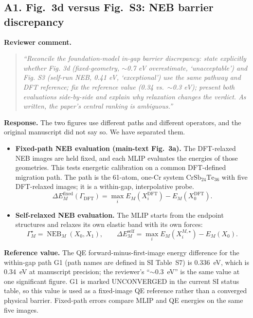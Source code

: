 \documentclass[11pt,a4paper]{article}
\begin{document}
\subsection*{A1. Fig.~3d versus Fig.~S3: NEB barrier discrepancy}

\noindent\textbf{Reviewer comment.}
\begin{quote}
\itshape
``Reconcile the foundation-model in-gap barrier discrepancy: state explicitly whether Fig. 3d (fixed-geometry, $\sim$0.7 eV overestimate, `unacceptable') and Fig. S3 (self-run NEB, 0.41 eV, `exceptional') use the same pathway and DFT reference; fix the reference value (0.34 vs.\ $\sim$0.3 eV); present both evaluations side-by-side and explain why relaxation changes the verdict. As written, the paper's central ranking is ambiguous.''
\end{quote}

\noindent\textbf{Response.}
The two figures use different paths and different operators, and the original manuscript did not say so. We have separated them.

\begin{itemize}
    \item \textbf{Fixed-path NEB evaluation (main-text Fig.~3a).}
    The DFT-relaxed NEB images are held fixed, and each MLIP evaluates the energies of those geometries. This tests energetic calibration on a common DFT-defined migration path. The path is the 61-atom, one-Cr system $\mathrm{CrSb_{24}Te_{36}}$ with five DFT-relaxed images; it is a within-gap, interpolative probe.
    \begin{equation}
    \Delta E^{\mathrm{fixed}}_M(\Gamma_{\mathrm{DFT}})
    =
    \max_i E_M(X_i^{\mathrm{DFT}})
    -
    E_M(X_0^{\mathrm{DFT}}).
    \end{equation}

    \item \textbf{Self-relaxed NEB evaluation.}
    The MLIP starts from the endpoint structures and relaxes its own elastic band with its own forces:
    \begin{equation}
    \Gamma_M^\star = \operatorname{NEB}_M(X_0,X_1),
    \qquad
    \Delta E^{\mathrm{self}}_M
    =
    \max_i E_M(X_i^{M,\star})
    -
    E_M(X_0).
    \end{equation}
\end{itemize}

\textbf{Reference value.} The QE forward-minus-first-image energy difference for the within-gap path G1 (path names are defined in SI Table~S7) is 0.336~eV, which is 0.34~eV at manuscript precision; the reviewer's ``$\sim$0.3~eV'' is the same value at one significant figure. G1 is marked UNCONVERGED in the current SI status table, so this value is used as a fixed-image QE reference rather than a converged physical barrier. Fixed-path errors compare MLIP and QE energies on the same five images.
\end{document}
